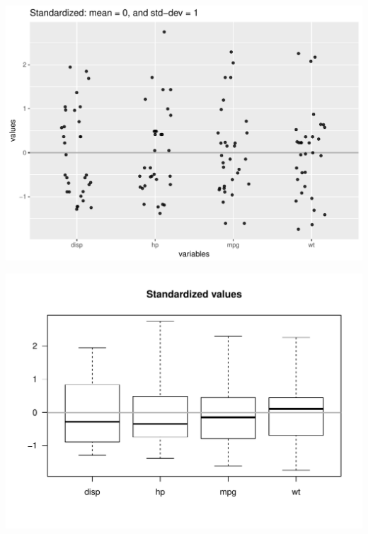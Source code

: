 \documentclass[12pt]{beamer}\usepackage[]{graphicx}\usepackage[]{color}
\makeatletter
\def\maxwidth{ %
  \ifdim\Gin@nat@width>\linewidth
    \linewidth
  \else
    \Gin@nat@width
  \fi
}
\newenvironment{knitrout}{}{} %
\makeatother
\begin{document}
\begin{frame}[fragile]



\begin{knitrout}\footnotesize
{}\color{fgcolor}

{\centering \includegraphics[width=\maxwidth]{figure/unnamed-chunk-23-1} 

}



\end{knitrout}

\end{frame}


\begin{frame}[fragile]

\begin{knitrout}\footnotesize
{}\color{fgcolor}

{\centering \includegraphics[width=\maxwidth]{figure/unnamed-chunk-24-1} 

}



\end{knitrout}

\end{frame}
\end{document}
